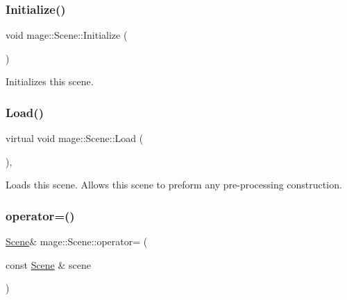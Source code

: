 \subsubsection{\texorpdfstring{Initialize()}{Initialize()}}
{\footnotesize\ttfamily void mage\+::\+Scene\+::\+Initialize (\begin{DoxyParamCaption}{ }\end{DoxyParamCaption})}

Initializes this scene. \hypertarget{classmage_1_1_scene_a1fb4a93eaa2f6a9e20594e205abb9a32}{}\label{classmage_1_1_scene_a1fb4a93eaa2f6a9e20594e205abb9a32} 
\subsubsection{\texorpdfstring{Load()}{Load()}}
{\footnotesize\ttfamily virtual void mage\+::\+Scene\+::\+Load (\begin{DoxyParamCaption}{ }\end{DoxyParamCaption})\hspace{0.3cm}{\ttfamily [private]}, {\ttfamily [virtual]}}

Loads this scene. Allows this scene to preform any pre-\/processing construction. \hypertarget{classmage_1_1_scene_a2c25c0fedc0230771d8c00a8288a69ce}{}\label{classmage_1_1_scene_a2c25c0fedc0230771d8c00a8288a69ce} 
\subsubsection{\texorpdfstring{operator=()}{operator=()}\hspace{0.1cm}{\footnotesize\ttfamily [1/2]}}
{\footnotesize\ttfamily \hyperlink{classmage_1_1_scene}{Scene}\& mage\+::\+Scene\+::operator= (\begin{DoxyParamCaption}\item[{const \hyperlink{classmage_1_1_scene}{Scene} \&}]{scene }\end{DoxyParamCaption})\hspace{0.3cm}{\ttfamily [delete]}}

\hypertarget{classmage_1_1_scene_a400926762670c9cd9b6d456291600f53}{}\label{classmage_1_1_scene_a400926762670c9cd9b6d456291600f53} 

